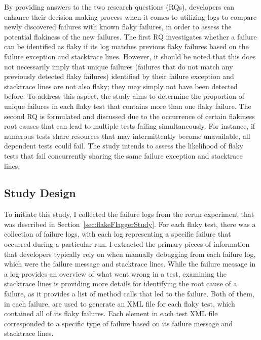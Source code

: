 By providing answers to the two research questions (RQs), developers can enhance their decision making process when it comes to utilizing logs to compare newly discovered failures with known flaky failures, in order to assess the potential flakiness of the new failures. The first RQ investigates whether a failure can be identified as flaky if its log matches previous flaky failures based on the failure exception and stacktrace lines. 
However, it should be noted that this does not necessarily imply that unique failures (failures that do not match any previously detected flaky failures) identified by their failure exception and stacktrace lines are not also flaky; they may simply not have been detected before. To address this aspect, the study aims to determine the proportion of unique failures in each flaky test that contains more than one flaky failure. The second RQ is formulated and discussed due to the occurrence of certain flakiness root causes that can lead to multiple tests failing simultaneously. For instance, if numerous tests share resources that may intermittently become unavailable, all dependent tests could fail. The study intends to assess the likelihood of flaky tests that fail concurrently sharing the same failure exception and stacktrace lines.

\newpage


 \subsection{Study Design}

To initiate this study, I collected the failure logs from the rerun experiment that was described in Section~\ref{sec:flakeFlaggerStudy}. For each flaky test, there was a collection of failure logs, with each log representing a specific failure that occurred during a particular run. I extracted the primary pieces of information that developers typically rely on when manually debugging from each failure log, which were the failure message and stacktrace lines. While the failure message in a log provides an overview of what went wrong in a test, examining the stacktrace lines is providing more details for identifying the root cause of a failure, as it provides a list of method calls that led to the failure. Both of them, in each failure, are used to generate an XML file for each flaky test, which contained all of its flaky failures. Each element in each test XML file corresponded to a specific type of failure based on its failure message and stacktrace lines.

